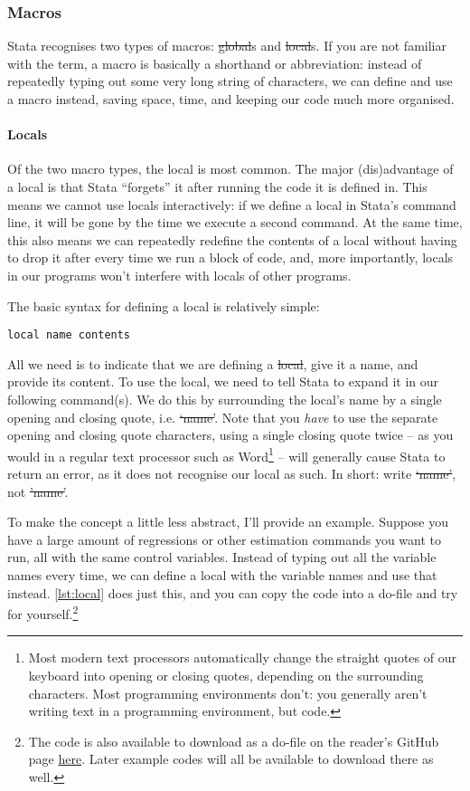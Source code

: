 \subsubsection{Macros}

Stata recognises two types of macros: \st{global}s and \st{local}s.
If you are not familiar with the term,
a macro is basically a shorthand or abbreviation:
instead of repeatedly typing out some very long string of characters,
we can define and use a macro instead, saving space, time,
and keeping our code much more organised.

\paragraph{Locals}
Of the two macro types, the local is most common.
The major (dis)advantage of a local is that Stata ``forgets'' it after running the code it is defined in.
This means we cannot use locals interactively:
if we define a local in Stata's command line,
it will be gone by the time we execute a second command.
At the same time,
this also means we can repeatedly redefine the contents of a local without having to drop it after every time we run a block of code,
and, more importantly, locals in our programs won't interfere with locals of other programs.

The basic syntax for defining a local is relatively simple:
\begin{verbatim}
local name contents
\end{verbatim}
All we need is to indicate that we are defining a \st{local}, give it a name,
and provide its content.
To use the local, we need to tell Stata to expand it in our following command(s).
We do this by surrounding the local's name by a single opening and closing quote, i.e. \st{`name'}.
Note that you \emph{have} to use the separate opening and closing quote characters,
using a single closing quote twice --
as you would in a regular text processor such as Word\footnote{%
Most modern text processors automatically change the straight quotes of our keyboard into opening or closing quotes,
depending on the surrounding characters.
Most programming environments don't:
you generally aren't writing text in a programming environment, but code.} --
will generally cause Stata to return an error,
as it does not recognise our local as such.
In short: write \st{`name'}, not \st{'name'}.

To make the concept a little less abstract, I'll provide an example.
Suppose you have a large amount of regressions or other estimation commands you want to run,
all with the same control variables.
Instead of typing out all the variable names every time,
we can define a local with the variable names and use that instead.
\cref{lst:local} does just this, and you can copy the code into a do-file and try for yourself.\footnote{%
The code is also available to download as a do-file on the reader's GitHub page \href{https://github.com/Ahvns/ETPreader/tree/main/Example\%20do-files}{here}.
Later example codes will all be available to download there as well.}

